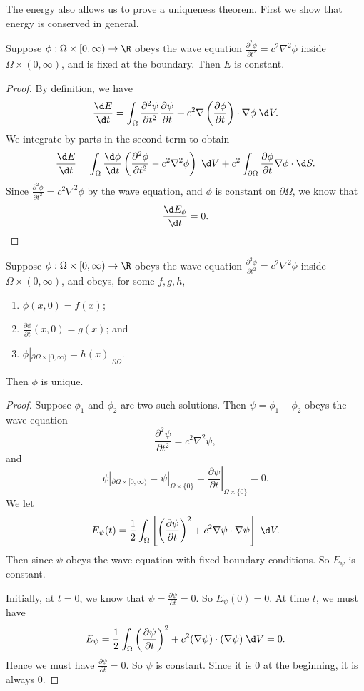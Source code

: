 \documentclass[a4paper]{article}
\begin{document}
The energy also allows us to prove a uniqueness theorem. First we show that energy is conserved in general.

\begin{prop}
  Suppose $\phi: \Omega \times [0, \infty) \to \R$ obeys the wave equation $\frac{\partial^2 \phi}{\partial t^2} = c^2 \nabla^2 \phi$ inside $\Omega \times (0, \infty)$, and is fixed at the boundary. Then $E$ is constant.
\end{prop}

\begin{proof}
  By definition, we have
  \[
    \frac{\d E}{\d t} = \int_\Omega \frac{\partial^2 \psi}{\partial t^2}\frac{\partial \psi}{\partial t} + c^2 \nabla \left(\frac{\partial \phi}{\partial t}\right)\cdot \nabla \phi \;\d V.
  \]
  We integrate by parts in the second term to obtain
  \[
    \frac{\d E}{\d t} = \int_\Omega \frac{\d \phi}{\d t}\left(\frac{\partial^2 \phi}{\partial t^2} - c^2 \nabla^2 \phi\right)\;\d V + c^2 \int_{\partial \Omega} \frac{\partial \phi}{\partial t}\nabla \phi \cdot \d S.
  \]
  Since $\frac{\partial^2 \phi}{\partial t^2} = c^2 \nabla^2 \phi$ by the wave equation, and $\phi$ is constant on $\partial \Omega$, we know that
  \[
    \frac{\d E_\phi}{\d t} = 0.
  \]
\end{proof}

\begin{prop}
  Suppose $\phi: \Omega \times [0, \infty) \to \R$ obeys the wave equation $\frac{\partial^2 \phi}{\partial t^2} = c^2 \nabla^2 \phi$ inside $\Omega \times (0, \infty)$, and obeys, for some $f, g, h$,
  \begin{enumerate}
    \item $\phi(x, 0) = f(x)$;
    \item $\frac{\partial \phi}{\partial t}(x, 0) = g(x)$; and
    \item $\phi|_{\partial \Omega\times [0, \infty)} = h(x)|_{\partial \Omega}$.
  \end{enumerate}
  Then $\phi$ is unique.
\end{prop}
\begin{proof}
  Suppose $\phi_1$ and $\phi_2$ are two such solutions. Then $\psi = \phi_1 - \phi_2$ obeys the wave equation
  \[
    \frac{\partial^2 \psi}{\partial t^2} = c^2 \nabla^2 \psi,
  \]
  and
  \[
    \psi|_{\partial \Omega \times [0, \infty)} = \psi|_{\Omega \times \{0\}} = \left.\frac{\partial \psi}{\partial t}\right|_{\Omega \times \{0\}} = 0.
  \]
  We let
  \[
    E_\psi(t) = \frac{1}{2}\int_\Omega \left[\left(\frac{\partial \psi}{\partial t}\right)^2 + c^2 \nabla \psi \cdot \nabla \psi\right] \;\d V.
  \]
  Then since $\psi$ obeys the wave equation with fixed boundary conditions. So $E_\psi$ is constant.

  Initially, at $t = 0$, we know that $\psi = \frac{\partial \psi}{\partial t} = 0$. So $E_\psi(0) = 0$. At time $t$, we must have
  \[
    E_\psi = \frac{1}{2}\int_\Omega \left(\frac{\partial \psi}{\partial t}\right)^2 + c^2 (\nabla \psi)\cdot (\nabla \psi) \;\d V = 0.
  \]
  Hence we must have $\frac{\partial \psi}{\partial t} = 0$. So $\psi$ is constant. Since it is $0$ at the beginning, it is always $0$.
\end{proof}
\end{document}
